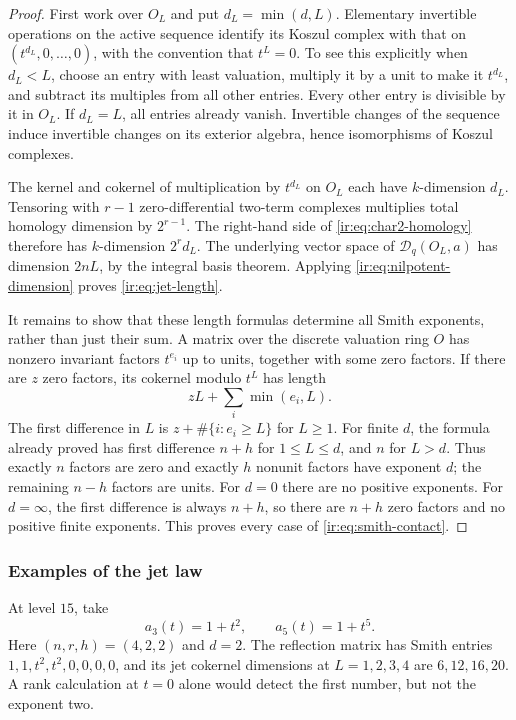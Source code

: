 \begin{proof}
First work over $O_L$ and put $d_L=\min(d,L)$. Elementary invertible
operations on the active sequence identify its Koszul complex with
that on $(t^{d_L},0,\ldots,0)$, with the convention that $t^L=0$.
To see this explicitly when $d_L<L$, choose an entry with least
valuation, multiply it by a unit to make it $t^{d_L}$, and subtract
its multiples from all other entries. Every other entry is divisible
by it in $O_L$. If $d_L=L$, all entries already vanish. Invertible
changes of the sequence induce invertible changes on its exterior
algebra, hence isomorphisms of Koszul complexes.

The kernel and cokernel of multiplication by $t^{d_L}$ on $O_L$
each have $k$-dimension $d_L$. Tensoring with $r-1$ zero-differential
two-term complexes multiplies total homology dimension by $2^{r-1}$.
The right-hand side of \eqref{ir:eq:char2-homology} therefore has
$k$-dimension $2^r d_L$. The underlying vector space of
$\mathcal D_q(O_L,a)$ has dimension $2nL$, by the integral basis theorem.
Applying \eqref{ir:eq:nilpotent-dimension} proves
\eqref{ir:eq:jet-length}.

It remains to show that these length formulas determine all Smith
exponents, rather than just their sum. A matrix over the discrete
valuation ring $O$ has nonzero invariant factors $t^{e_i}$ up to
units, together with some zero factors. If there are $z$ zero
factors, its cokernel modulo $t^L$ has length
\[
 zL+\sum_i\min(e_i,L).
\]
The first difference in $L$ is $z+\#\{i:e_i\ge L\}$ for $L\ge1$.
For finite $d$, the formula already proved has first difference
$n+h$ for $1\le L\le d$, and $n$ for $L>d$. Thus exactly $n$
factors are zero and exactly $h$ nonunit factors have exponent $d$;
the remaining $n-h$ factors are units. For $d=0$ there are no
positive exponents. For $d=\infty$, the first difference is always
$n+h$, so there are $n+h$ zero factors and no positive finite
exponents. This proves every case of \eqref{ir:eq:smith-contact}.
\end{proof}

\subsubsection{Examples of the jet law}
At level $15$, take
\[
 a_3(t)=1+t^2,\qquad a_5(t)=1+t^5.
\]
Here $(n,r,h)=(4,2,2)$ and $d=2$. The reflection matrix has Smith
entries $1,1,t^2,t^2,0,0,0,0$, and its jet cokernel dimensions at
$L=1,2,3,4$ are $6,12,16,20$. A rank calculation at $t=0$ alone
would detect the first number, but not the exponent two.

